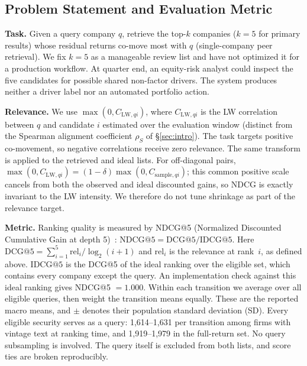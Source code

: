 \documentclass[sigconf,anonymous]{acmart}
\begin{document}
\subsection{Problem Statement and Evaluation Metric}
\label{sec:problem}

\textbf{Task.}
Given a query company $q$, retrieve the top-$k$ companies ($k{=}5$ for primary results) whose residual returns
co-move most with $q$ (single-company peer retrieval).
We fix $k=5$ as a manageable review list and have not optimized it for a
production workflow.  At quarter end, an equity-risk analyst could inspect the
five candidates for possible shared non-factor drivers.  The system produces
neither a driver label nor an automated portfolio action.

\textbf{Relevance.}
We use $\max(0, C_{\mathrm{LW},qi})$, where $C_{\mathrm{LW},qi}$ is the LW
correlation between $q$ and candidate $i$ estimated over the evaluation window
(distinct from the Spearman alignment coefficient $\rho_S$ of \S\ref{sec:intro}).
The task targets positive co-movement, so negative correlations receive zero
relevance.  The same transform is applied to the retrieved and ideal lists.
For off-diagonal pairs,
$\max(0,C_{\mathrm{LW},qi})=(1-\delta)\max(0,C_{\mathrm{sample},qi})$; this common
positive scale cancels from both the observed and ideal discounted gains, so
NDCG is exactly invariant to the LW
intensity.  We therefore do not tune shrinkage as part of the relevance target.

\textbf{Metric.}
Ranking quality is measured by NDCG@5 (Normalized Discounted Cumulative Gain at
depth 5)~\citep{jarvelin2002cumulated}:
$\mathrm{NDCG@5} = \mathrm{DCG@5} / \mathrm{IDCG@5}$.
Here $\mathrm{DCG@5} = \sum_{i=1}^{5} \mathrm{rel}_i / \log_2(i{+}1)$ and
$\mathrm{rel}_i$ is the relevance at rank~$i$, as defined above.
$\mathrm{IDCG@5}$ is the DCG@5 of the ideal ranking over the eligible set, which
contains every company except the query.  An implementation check against this
ideal ranking gives NDCG@5 $= 1.000$.
Within each transition we average over all eligible queries, then weight the
transition means equally.  These are the reported macro means, and $\pm$ denotes
their population standard deviation (SD).  Every eligible security serves as a
query: 1,614--1,631 per transition among firms with vintage text at ranking
time, and 1,919--1,979 in the full-return set.  No query subsampling is involved.
The query itself is excluded from both lists,
and score ties are broken reproducibly.
\end{document}
